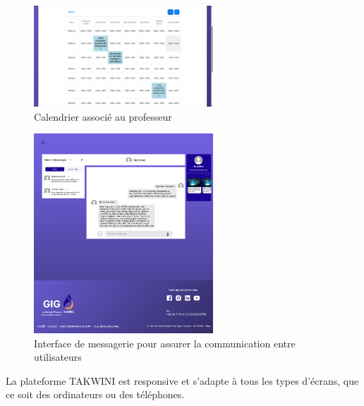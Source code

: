\documentclass{article}
\begin{document}
\begin{figure}[H]
  \centering
  \includegraphics[width=0.6\textwidth]{calendarprof.png}
  \caption{Calendrier associé au professeur}
  \label{fig:planif1}
\end{figure}

\begin{figure}[H]
  \centering
  \includegraphics[width=0.6\textwidth]{messages.png}
  \caption{Interface de messagerie pour assurer la communication entre utilisateurs}
  \label{fig:planif2}
\end{figure}


La plateforme TAKWINI est responsive et s’adapte à tous les types d’écrans, que ce soit des ordinateurs ou des téléphones. 
\end{document}
